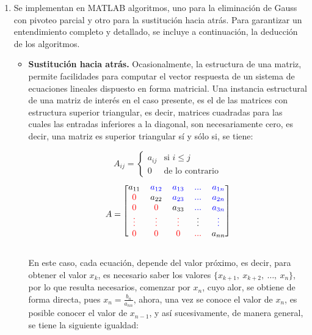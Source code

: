 \documentclass[11pt, spanish]{article}
\newcommand\RED{\color{red}}
\newcommand\BLUE{\color{blue}}
\begin{document}
\begin{enumerate}
\item Se implementan en \textsc{MATLAB} algoritmos, uno para la eliminación de Gauss con pivoteo parcial y otro para la sustitución hacia atrás. Para garantizar un entendimiento completo y detallado, se incluye a continuación,  la deducción de los algoritmos. 

\begin{itemize}
\item \textbf{Sustitución hacia atrás.} Ocasionalmente, la estructura de una matriz, permite facilidades para computar el vector respuesta de un sistema de ecuaciones lineales dispuesto en forma matricial. Una instancia estructural de una matriz de interés en el caso presente, es el de las matrices con estructura superior triangular, es decir, matrices cuadradas para las cuales las entradas inferiores a la diagonal, son necesariamente cero, es decir, una matriz es superior triangular sí y sólo si, se tiene:


\begin{multicols}{2}
  $$
  A_{ij} =
  \begin{cases}
    a_{ij} & \text{si } i \leq j \\
    0 & \text{de lo contrario}
  \end{cases} 
$$\break
  $$A = 
\begin{blockarray}{ccccc}
\begin{block}{[ccccc]}
 a_{11} & \BLUE a_{12} & \BLUE a_{13} & \BLUE ... & \BLUE a_{1n} \\
 \RED 0 & a_{22} & \BLUE a_{23} & \BLUE ... &  \BLUE a_{2n} \\
 \RED 0 & \RED 0 & a_{33} &  \BLUE... & \BLUE a_{3n} \\
 \RED \vdots & \RED \vdots &\RED \vdots & \vdots & \BLUE \vdots\\
 \RED 0 & \RED 0 & \RED 0 & \RED ... & a_{nn} \\
\end{block}
\end{blockarray}$$
\end{multicols}

En este caso, cada ecuación, depende del valor próximo, es decir, para obtener el valor $x_k$, es necesario saber los valores $\{x_{k+1},\ x_{k + 2},\ \dots,\ x_{n} \}$, por lo que resulta necesarios, comenzar por $x_{n}$, cuyo alor, se obtiene de forma directa, pues $x_n = \frac{b_n}{a_{nn}}$, ahora, una vez se conoce el valor de $x_n$, es posible conocer el valor de $x_{n-1}$, y así sucesivamente, de manera general, se tiene la siguiente igualdad:


\end{itemize}
\end{enumerate}
\end{document}
